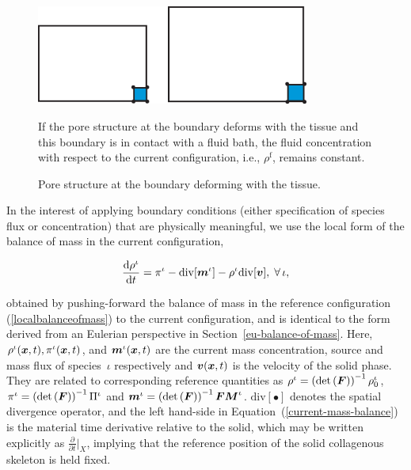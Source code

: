 \begin{figure}
  \begin{center}
    \includegraphics[width=0.8\textwidth]{images/elucidation/concentration}
    \caption{Pore structure at the boundary deforming with the tissue.} 
    \label{current-conc-fluid-bc}
  \end{center}
      {If the pore structure at the boundary deforms with the tissue and this
        boundary is in contact with a fluid bath, the fluid concentration
        with respect to the current configuration, i.e., $\rho^\mathrm{f}$,
        remains constant.}
\end{figure}

In the interest of applying boundary conditions (either specification
of species flux or concentration) that are physically meaningful, we
use the local form of the balance of mass in the current
configuration,

\begin{equation}
  \frac{\mathrm{d}\rho^\iota}{\mathrm{d}t} = \pi^\iota-
  \mathrm{div}[\mbox{\boldmath$ m$}^\iota] - \rho^\iota
  \mathrm{div}[\mbox{\boldmath$ v$}],\;\forall\,\iota,
  \label{current-mass-balance}
\end{equation}

\noindent obtained by pushing-forward the balance of mass in the
reference configuration (\ref{localbalanceofmass}) to the current
configuration, and is identical to the form derived from an Eulerian
perspective in Section~\ref{eu-balance-of-mass}. Here,
$\rho^\iota(\mbox{\boldmath$ x$},t),\pi^\iota(\mbox{\boldmath$ x$},t)$, and $\mbox{\boldmath$ m$}^\iota(\mbox{\boldmath$ x$},t)$ are the
current mass concentration, source and mass flux of species~$\iota$
respectively and $\mbox{\boldmath$ v$}(\mbox{\boldmath$ x$},t)$ is the velocity of the solid phase. They
are related to corresponding reference quantities as \mbox{$\rho^\iota
  = \left(\mathrm{det} \left(\mbox{\boldmath$ F$}\right) \right)^{-1} \rho_0^\iota$},
\mbox{$\pi^\iota = \left(\mathrm{det} \left(\mbox{\boldmath$ F$}\right) \right)^{-1}
  \Pi^\iota$} and \mbox{$\mbox{\boldmath$ m$}^\iota = \left(\mathrm{det}
  \left(\mbox{\boldmath$ F$}\right) \right)^{-1} \mbox{\boldmath$ F$}
  \mbox{\boldmath$ M$}^\iota$}. $\mathrm{div}[\bullet]$ denotes the spatial divergence
operator, and the left hand-side in
Equation~(\ref{current-mass-balance}) is the material time derivative
relative to the solid, which may be written explicitly as
$\frac{\partial}{\partial t}\vert_X$, implying that the reference
position of the solid collagenous skeleton is held fixed.

